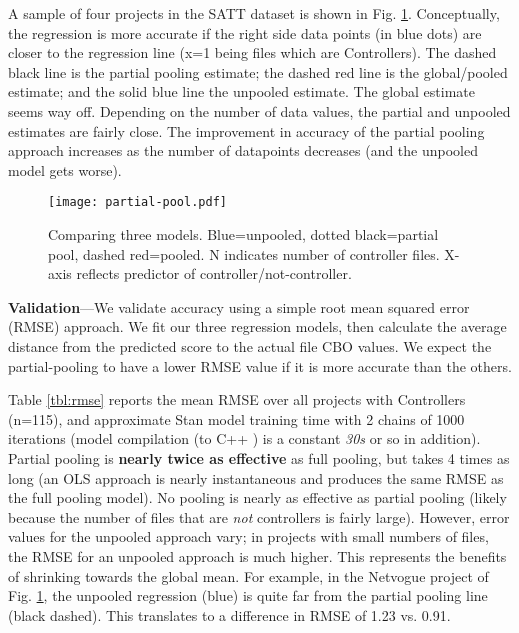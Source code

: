 \documentclass[sigconf,natbib=false]{acmart}
\begin{document}
A sample of four projects in the SATT dataset is shown in Fig. \ref{fig:partial-pool}. Conceptually, the regression is more accurate if the right side data points (in blue dots) are closer to the regression line (x=1 being files which are Controllers). The dashed black line is the partial pooling estimate; the dashed red line is the global/pooled estimate; and the solid blue line the unpooled estimate. The global estimate seems way off. Depending on the number of data values, the partial and unpooled estimates are fairly close. The improvement in accuracy of the partial pooling approach increases as the number of datapoints decreases (and the unpooled model gets worse). 

\begin{figure}[tb]
	\centering
	\texttt{[image: partial-pool.pdf]}
	\caption{Comparing three models. Blue=unpooled, dotted black=partial pool, dashed red=pooled. N indicates number of controller files. X-axis reflects predictor of controller/not-controller.}
	\label{fig:partial-pool}
\end{figure}

\noindent\textbf{Validation}---We validate accuracy using a simple root mean squared error (RMSE) approach.%
We fit our three regression models, then calculate the average distance from the predicted score to the actual file CBO values. We expect the partial-pooling to have a lower RMSE value if it is more accurate than the others. %

Table \ref{tbl:rmse} reports the mean RMSE over all projects with Controllers (n=115), and approximate Stan model training time with 2 chains of 1000 iterations (model compilation (to C++	) is a constant \emph{30s} or so in addition). Partial pooling is \textbf{nearly twice as effective} as full pooling, but takes 4 times as long (an OLS approach is nearly instantaneous and produces the same RMSE as the full pooling model). No pooling is nearly as effective as partial pooling (likely because the number of files that are \emph{not} controllers is fairly large). However, error values for the unpooled approach vary; in projects with small numbers of files, the RMSE for an unpooled approach is much higher. This represents the benefits of shrinking towards the global mean. For example, in the Netvogue project of Fig. \ref{fig:partial-pool}, the unpooled regression (blue) is quite far from the partial pooling line (black dashed). This translates to a difference in RMSE of 1.23 vs. 0.91.
\end{document}
